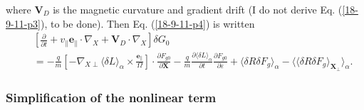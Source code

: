 \documentclass{article}
\newcommand{\tmmathbf}[1]{\ensuremath{\boldsymbol{#1}}}
\begin{document}
where $\mathbf{V}_D$ is the magnetic curvature and gradient drift (I do not
derive Eq. (\ref{18-9-11-p3}), to be done). Then Eq. (\ref{18-9-11-p4}) is
written
\begin{eqnarray}
  &  & \left[ \frac{\partial}{\partial t} + v_{\parallel}
  \mathbf{e}_{\parallel} \cdot \nabla_X +\mathbf{V}_D \cdot \nabla_X \right]
  \delta G_0 \nonumber\\
  &  & = - \frac{q}{m} \left[ - \nabla_{X \perp} \langle \delta L
  \rangle_{\alpha} \times \frac{\tmmathbf{e}_{\parallel}}{\Omega} \right]
  \cdot \frac{\partial F_{g 0}}{\partial \mathbf{X}} - \frac{q}{m} 
  \frac{\partial \langle \delta L \rangle_{\alpha}}{\partial t} 
  \frac{\partial F_{g 0}}{\partial \varepsilon} + \langle \delta R \delta F_g
  \rangle_{\alpha} - \langle \langle \delta R \delta F_g
  \rangle_{\mathbf{X}_{\perp}} \rangle_{\alpha} .  \label{17-5-5-1}
\end{eqnarray}

\subsubsection{Simplification of the nonlinear term}
\end{document}
